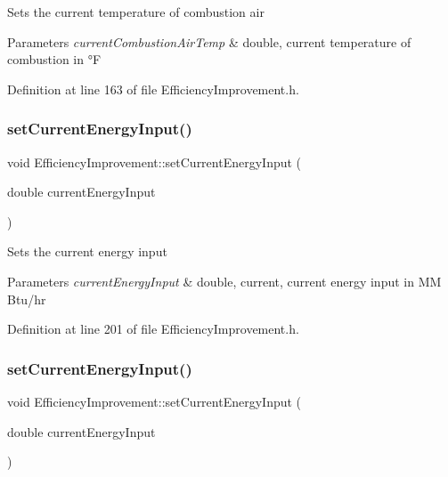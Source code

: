 Sets the current temperature of combustion air


\begin{DoxyParams}{Parameters}
{\em current\+Combustion\+Air\+Temp} & double, current temperature of combustion in °F \\
\hline
\end{DoxyParams}


Definition at line 163 of file Efficiency\+Improvement.\+h.

\mbox{\label{class_efficiency_improvement_a72c247fcd3f7791566205ec783e13d81}} 
\subsubsection{\texorpdfstring{set\+Current\+Energy\+Input()}{setCurrentEnergyInput()}\hspace{0.1cm}{\footnotesize\ttfamily [1/3]}}
{\footnotesize\ttfamily void Efficiency\+Improvement\+::set\+Current\+Energy\+Input (\begin{DoxyParamCaption}\item[{double}]{current\+Energy\+Input }\end{DoxyParamCaption})\hspace{0.3cm}{\ttfamily [inline]}}

Sets the current energy input


\begin{DoxyParams}{Parameters}
{\em current\+Energy\+Input} & double, current, current energy input in MM Btu/hr \\
\hline
\end{DoxyParams}


Definition at line 201 of file Efficiency\+Improvement.\+h.

\mbox{\label{class_efficiency_improvement_a72c247fcd3f7791566205ec783e13d81}} 
\subsubsection{\texorpdfstring{set\+Current\+Energy\+Input()}{setCurrentEnergyInput()}\hspace{0.1cm}{\footnotesize\ttfamily [2/3]}}
{\footnotesize\ttfamily void Efficiency\+Improvement\+::set\+Current\+Energy\+Input (\begin{DoxyParamCaption}\item[{double}]{current\+Energy\+Input }\end{DoxyParamCaption})\hspace{0.3cm}{\ttfamily [inline]}}

